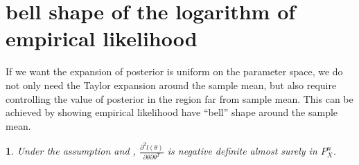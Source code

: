 \documentclass[oneside,english]{amsbook}
\numberwithin{section}{chapter}
\numberwithin{equation}{section}
\numberwithin{figure}{section}
\theoremstyle{plain}
\newtheorem{lem}{\protect\lemmaname}
\theoremstyle{plain}
\theoremstyle{definition}
\theoremstyle{plain}
\theoremstyle{plain}
\theoremstyle{remark}
\theoremstyle{definition}
\theoremstyle{definition}
\providecommand{\lemmaname}{Lemma}
\begin{document}
\section{bell shape of the logarithm of empirical likelihood}

If we want the expansion of posterior is uniform on the parameter
space, we do not only need the Taylor expansion around the sample
mean, but also require controlling the value of posterior in the region
far from sample mean. This can be achieved by showing empirical likelihood
have ``bell'' shape around the sample mean. 
\begin{lem}
\label{lem:second-order-der-neg-def}Under the assumption 
and , $\frac{\partial^{2}\hat{l}\left(\theta\right)}{\partial\theta\partial\theta^{T}}$
is negative definite almost surely in $P_{X}^{n}$. \end{lem}
\end{document}
